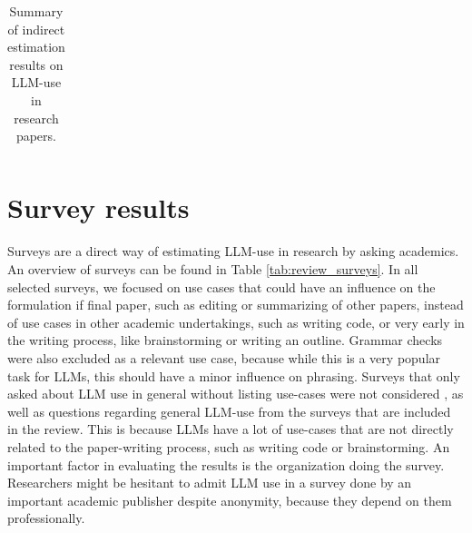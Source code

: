 \begin{table}
\begin{tabular}{rllrlc}
\bottomrule
\end{tabular}
\caption{Summary of indirect estimation results on LLM-use in research papers.}
\label{tab:review_estimation}
\end{table}



\section{Survey results}\label{ap:surveys}
Surveys are a direct way of estimating LLM-use in research by asking academics.
An overview of surveys can be found in Table \ref{tab:review_surveys}.
In all selected surveys, we focused on use cases that could have an influence on the formulation if final paper, such as editing or summarizing of other papers, instead of use cases in other academic undertakings, such as writing code, or very early in the writing process, like brainstorming or writing an outline.
Grammar checks were also excluded as a relevant use case, because while this is a very popular task for LLMs, this should have a minor influence on phrasing.
Surveys that only asked about LLM use in general without listing use-cases were not considered \cite{Elsevier2024}, as well as questions regarding general LLM-use from the surveys that are included in the review. 
This is because LLMs have a lot of use-cases that are not directly related to the paper-writing process, such as writing code or brainstorming.
An important factor in evaluating the results is the organization doing the survey.
Researchers might be hesitant to admit LLM use in a survey done by an important academic publisher despite anonymity, because they depend on them professionally.

